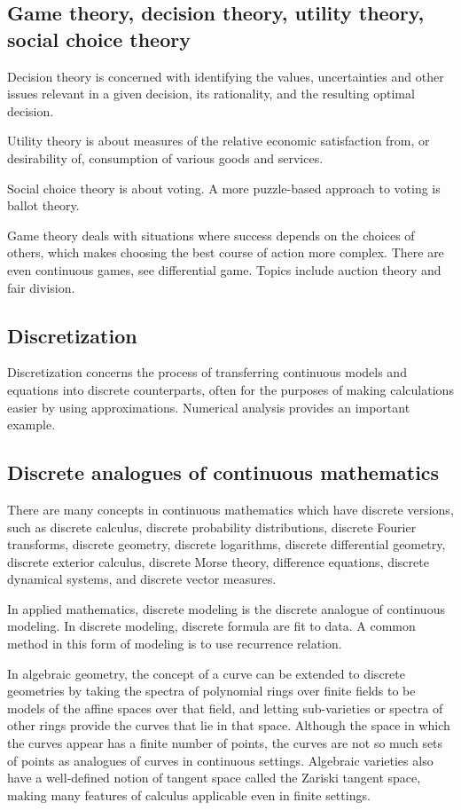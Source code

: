 \documentclass{article}
\begin{document}
\subsection{Game theory, decision theory, utility theory, social choice theory}
Decision theory is concerned with identifying the values, uncertainties and other issues relevant in a given decision, its rationality, and the resulting optimal decision.

Utility theory is about measures of the relative economic satisfaction from, or desirability of, consumption of various goods and services.

Social choice theory is about voting. A more puzzle-based approach to voting is ballot theory.

Game theory deals with situations where success depends on the choices of others, which makes choosing the best course of action more complex. There are even continuous games, see differential game. Topics include auction theory and fair division. 
\subsection{Discretization} 
Discretization concerns the process of transferring continuous models and equations into discrete counterparts, often for the purposes of making calculations easier by using approximations. Numerical analysis provides an important example.
\subsection{Discrete analogues of continuous mathematics}
There are many concepts in continuous mathematics which have discrete versions, such as discrete calculus, discrete probability distributions, discrete Fourier transforms, discrete geometry, discrete logarithms, discrete differential geometry, discrete exterior calculus, discrete Morse theory, difference equations, discrete dynamical systems, and discrete vector measures.

In applied mathematics, discrete modeling is the discrete analogue of continuous modeling. In discrete modeling, discrete formula are fit to data. A common method in this form of modeling is to use recurrence relation.

In algebraic geometry, the concept of a curve can be extended to discrete geometries by taking the spectra of polynomial rings over finite fields to be models of the affine spaces over that field, and letting sub-varieties or spectra of other rings provide the curves that lie in that space. Although the space in which the curves appear has a finite number of points, the curves are not so much sets of points as analogues of curves in continuous settings.  Algebraic varieties also have a well-defined notion of tangent space called the Zariski tangent space, making many features of calculus applicable even in finite settings.  
\end{document}
